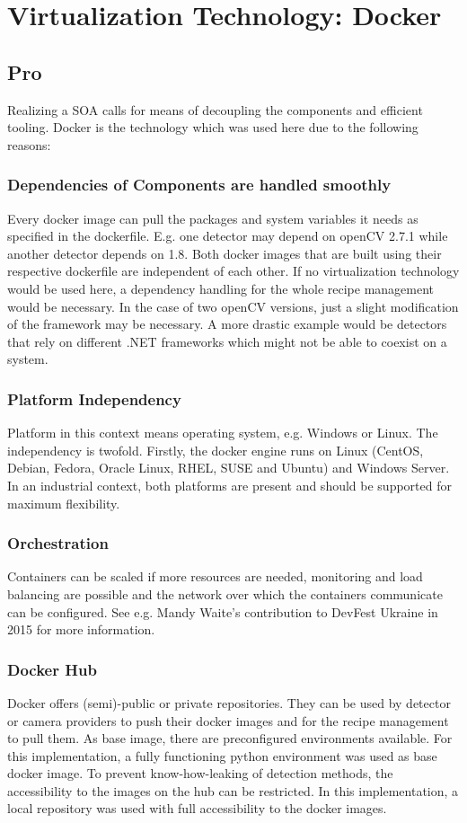 \section{Virtualization Technology: Docker}
\subsection{Pro}
Realizing a SOA calls for means of decoupling the components and efficient tooling. Docker is the technology which was used here due to the following reasons:
\subsubsection{Dependencies of Components are handled smoothly} 
Every docker image can pull the packages and system variables it needs as specified in the dockerfile. E.g. one detector may depend on openCV 2.7.1 while another detector depends on 1.8. Both docker images that are built using their respective dockerfile are independent of each other. If no virtualization technology would be used here, a dependency handling for the whole recipe management would be necessary. In the case of two openCV versions, just a slight modification of the framework may be necessary. A more drastic example would be detectors that rely on different .NET frameworks which might not be able to coexist on a system.
\subsubsection{Platform Independency}
 Platform in this context means operating system, e.g. Windows or Linux. The independency is twofold. Firstly, the docker engine runs on Linux (CentOS, Debian, Fedora, Oracle Linux, RHEL, SUSE and Ubuntu) and Windows Server. In an industrial context, both platforms are present and should be supported for maximum flexibility.
\subsubsection{Orchestration}
 Containers can be scaled if more resources are needed, monitoring and load balancing are possible and the network over which the containers communicate can be configured. See e.g. Mandy Waite's contribution to DevFest Ukraine in 2015 for more information.~\cite{Waite2015ScalableContainers}
\subsubsection{Docker Hub}
 Docker offers (semi)-public or private repositories. They can be used by detector or camera providers to push their docker images and for the recipe management to pull them. As base image, there are preconfigured environments available. For this implementation, a fully functioning python environment was used as base docker image. To prevent know-how-leaking of detection methods, the accessibility to the images on the hub can be restricted. In this implementation, a local repository was used with full accessibility to the docker images.

